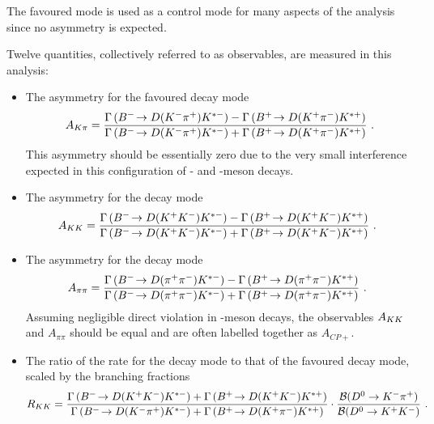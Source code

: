 The favoured mode is used  as a control mode for many aspects of the analysis since no \CP asymmetry is expected.

Twelve quantities, collectively referred to as \CP observables, are measured in this analysis:

\begin{itemize}
\item{The \CP asymmetry for the favoured decay mode
{\footnotesize
\begin{equation}
A_{{K}\pi} = \frac{\Gamma\left({{{B}^-}}\!\rightarrow {\ensuremath{D}}({{K}^-}{{\pi}^+}){{K}^{*-}}\right) - \Gamma\left({{{B}^+}}\!\rightarrow {\ensuremath{D}}({{K}^+}{{\pi}^-}){{K}^{*+}}\right)}{\Gamma\left({{{B}^-}}\!\rightarrow {\ensuremath{D}}({{K}^-}{{\pi}^+}){{K}^{*-}}\right) + \Gamma\left({{{B}^+}}\!\rightarrow {\ensuremath{D}}({{K}^+}{{\pi}^-}){{K}^{*+}}\right)} \text{ .}
\label{eqn:Akpi}
\end{equation}}%
\noindent%
This asymmetry should be essentially zero due to the very small interference expected in this configuration of \B- and \D-meson decays.
}
\item{The \CP asymmetry for the \decay{\D}{\Kp\Km} decay mode
{\footnotesize
\begin{equation}
A_{{K}{K}} = \frac{\Gamma\left({{{B}^-}}\!\rightarrow {\ensuremath{D}}({{K}^+}{{K}^-}){{K}^{*-}}\right) - \Gamma\left({{{B}^+}}\!\rightarrow {\ensuremath{D}}({{K}^+}{{K}^-}){{K}^{*+}}\right)}{\Gamma\left({{{B}^-}}\!\rightarrow {\ensuremath{D}}({{K}^+}{{K}^-}){{K}^{*-}}\right) + \Gamma\left({{{B}^+}}\!\rightarrow {\ensuremath{D}}({{K}^+}{{K}^-}){{K}^{*+}}\right)} \text{ . }
\label{eqn:Akk}
\end{equation}
}}
\item{The \CP asymmetry for the \decay{\D}{\pip\pim} decay mode
{\footnotesize
\begin{equation}
A_{\pi\pi} = \frac{\Gamma\left({{{B}^-}}\!\rightarrow {\ensuremath{D}}({{\pi}^+}{{\pi}^-}){{K}^{*-}}\right) - \Gamma\left({{{B}^+}}\!\rightarrow {\ensuremath{D}}({{\pi}^+}{{\pi}^-}){{K}^{*+}}\right)}{\Gamma\left({{{B}^-}}\!\rightarrow {\ensuremath{D}}({{\pi}^+}{{\pi}^-}){{K}^{*-}}\right) + \Gamma\left({{{B}^+}}\!\rightarrow {\ensuremath{D}}({{\pi}^+}{{\pi}^-}){{K}^{*+}}\right)} \text{ . }
\label{eqn:Apipi}
\end{equation}}
}
Assuming negligible direct \CP violation in \D-meson decays, the observables $A_{{K}{K}}$ and $A_{\pi\pi}$ should be equal and are often labelled together as $A_{CP+}$.
\item{The ratio of the rate for the \decay{\D}{\Kp\Km} decay mode to that of the favoured decay mode, scaled by the branching fractions
{\footnotesize
\begin{equation}
R_{\kaon\kaon} = \frac{\Gamma\left(\decay{\Bm}{\D(\Kp\Km)\Kstarm}\right) + \Gamma\left(\decay{\Bp}{\D(\Kp\Km)\Kstarp}\right)}{\Gamma\left(\decay{\Bm}{\D(\Km\pip)\Kstarm}\right) + \Gamma\left(\decay{\Bp}{\D(\Kp\pim)\Kstarp}\right)} \cdot \frac{\BR(D^0 \to K^-\pi^+)}{\BR(D^0 \to K^+K^-)} \text{ . }

\end{equation}}}
\end{itemize}
